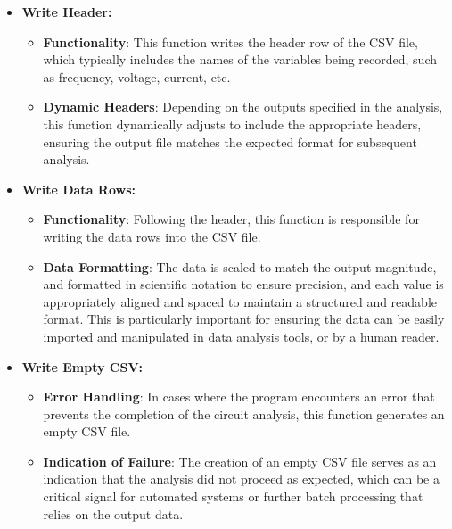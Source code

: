 \documentclass[conference]{IEEEtran}
\begin{document}
\begin{itemize}
      \item \textbf{Write Header:}
            \begin{itemize}
                  \item \textbf{Functionality}: This function writes the header row of the CSV file, which typically includes the names of the
                        variables being recorded, such as frequency, voltage, current, etc.
                  \item \textbf{Dynamic Headers}: Depending on the outputs specified in the analysis, this function dynamically adjusts to include
                        the appropriate headers, ensuring the output file matches the expected format for subsequent analysis.
            \end{itemize}

      \item \textbf{Write Data Rows:}
            \begin{itemize}
                  \item \textbf{Functionality}: Following the header, this function is responsible for writing the data rows into the CSV file.
                  \item \textbf{Data Formatting}: The data is scaled to match the output magnitude, and formatted in scientific notation to ensure precision, and each value is appropriately
                        aligned and spaced to maintain a structured and readable format. This is particularly important for ensuring the data can be
                        easily imported and manipulated in data analysis tools, or by a human reader.
            \end{itemize}

      \item \textbf{Write Empty CSV:}
            \begin{itemize}
                  \item \textbf{Error Handling}: In cases where the program encounters an error that prevents the completion of the circuit
                        analysis, this function generates an empty CSV file.
                  \item \textbf{Indication of Failure}: The creation of an empty CSV file serves as an indication that the analysis did not
                        proceed as expected, which can be a critical signal for automated systems or further batch processing that relies on the
                        output data.
            \end{itemize}


\end{itemize}
\end{document}
